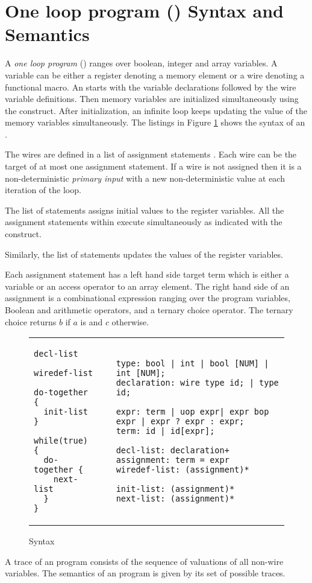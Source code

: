 \section{One loop program (\caig) Syntax and Semantics}
\label{sec:this}
A {\em one loop program} (\caig) ranges over boolean, 
integer and array variables. 
A variable can be either a register denoting a memory element or a wire denoting a functional macro.
An \caig starts with the variable declarations followed by the wire variable definitions. 
Then memory variables are initialized simultaneously using the  construct. 
After initialization, an infinite loop keeps updating the value of the memory variables simultaneously. The listings in Figure \ref{fig:gr} shows the syntax of an \caig. 

The wires are defined in a list of assignment statements . 
Each wire can be the target of at most one assignment statement. 
If a wire is not assigned then it is a non-deterministic {\em primary input}
with a new non-deterministic value at each iteration of the loop. 

The list of statements  assigns initial values to 
the register variables. All the assignment statements within  execute
simultaneously as indicated with the  construct.

Similarly, the  list of statements updates the values 
of the register variables. 

Each assignment statement has a left hand side target term 
which is either a variable or an access operator to an 
array element. 
The right hand side of an assignment is a combinational expression ranging over the program variables,  Boolean and arithmetic operators, and a ternary choice 
operator. The ternary choice  returns $b$ if $a$ 
is \true and $c$ otherwise. 

\begin{figure}
\begin{tabular}{p{3cm}p{0.5cm}p{12cm}}
\begin{lstlisting}
decl-list

wiredef-list

do-together {
  init-list 
}

while(true) {
  do-together {
    next-list
  } 
}
\end{lstlisting}
&
&
\begin{lstlisting}
type: bool | int | bool [NUM] | int [NUM]; 
declaration: wire type id; | type id;

expr: term | uop expr| expr bop expr | expr ? expr : expr;
term: id | id[expr]; 

decl-list: declaration+
assignment: term = expr
wiredef-list: (assignment)*

init-list: (assignment)* 
next-list: (assignment)* 
\end{lstlisting}
\end{tabular}
\caption{\caig Syntax}
\label{fig:gr}
\end{figure}


\begin{definition}
A trace of an \caig program consists of the sequence of valuations of all non-wire variables. The semantics of an \caig program is given by its set of possible traces.  
\end{definition}